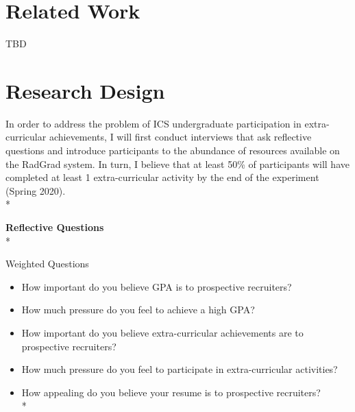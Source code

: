 \documentclass[english]{proposalnsf}
\begin{document}
  \section{Related Work}
  \label{related-work}

  TBD

  \section{Research Design}
  \label{research-design}

  In order to address the problem of ICS undergraduate participation in extra-curricular achievements, I will first conduct interviews that ask reflective questions and introduce participants to the abundance of resources available on the RadGrad system.
  In turn, I believe that at least 50\% of participants will have completed at least 1 extra-curricular activity by the end of the experiment (Spring 2020).\\*

  \textbf{Reflective Questions}\\*

  Weighted Questions
  \begin{itemize}
    \item How important do you believe GPA is to prospective recruiters?
    \item How much pressure do you feel to achieve a high GPA?
    \item How important do you believe extra-curricular achievements are to prospective recruiters?
    \item How much pressure do you feel to participate in extra-curricular activities?
    \item How appealing do you believe your resume is to prospective recruiters?\\*
  \end{itemize}
\end{document}
